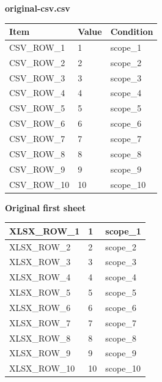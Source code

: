 \documentclass[11pt]{article}
\begin{document}
\par\noindent\begin{minipage}{\linewidth}
\par\noindent\textbf{original-csv.csv}\par\smallskip\noindent
\begingroup\small
\setlength{\tabcolsep}{3pt}
\begin{tabular}{|p{}|p{}|p{}|}
\hline
Item & Value & Condition \\ \hline
CSV\_ROW\_1 & 1 & scope\_1 \\ \hline
CSV\_ROW\_2 & 2 & scope\_2 \\ \hline
CSV\_ROW\_3 & 3 & scope\_3 \\ \hline
CSV\_ROW\_4 & 4 & scope\_4 \\ \hline
CSV\_ROW\_5 & 5 & scope\_5 \\ \hline
CSV\_ROW\_6 & 6 & scope\_6 \\ \hline
CSV\_ROW\_7 & 7 & scope\_7 \\ \hline
CSV\_ROW\_8 & 8 & scope\_8 \\ \hline
CSV\_ROW\_9 & 9 & scope\_9 \\ \hline
CSV\_ROW\_10 & 10 & scope\_10 \\ \hline
\end{tabular}
\endgroup
\end{minipage}\par
\par\noindent\begin{minipage}{\linewidth}
\par\noindent\textbf{Original first sheet}\par\smallskip\noindent
\begingroup\small
\setlength{\tabcolsep}{3pt}
\begin{tabular}{|p{}|p{}|p{}|}
\hline
XLSX\_ROW\_1 & 1 & scope\_1 \\ \hline
XLSX\_ROW\_2 & 2 & scope\_2 \\ \hline
XLSX\_ROW\_3 & 3 & scope\_3 \\ \hline
XLSX\_ROW\_4 & 4 & scope\_4 \\ \hline
XLSX\_ROW\_5 & 5 & scope\_5 \\ \hline
XLSX\_ROW\_6 & 6 & scope\_6 \\ \hline
XLSX\_ROW\_7 & 7 & scope\_7 \\ \hline
XLSX\_ROW\_8 & 8 & scope\_8 \\ \hline
XLSX\_ROW\_9 & 9 & scope\_9 \\ \hline
XLSX\_ROW\_10 & 10 & scope\_10 \\ \hline
\end{tabular}
\endgroup
\end{minipage}\par
\end{document}
